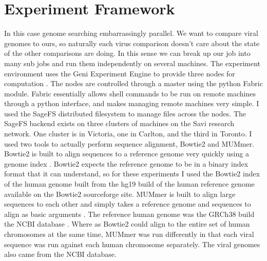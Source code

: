 
\section{Experiment Framework}

In this case genome searching embarrassingly parallel. We want to compare viral genomes to ours, so naturally each virus comparison doesn’t care about the state of the other comparisons are doing. In this sense we can break up our job into many sub jobs and run them independently on several machines. The experiment environment uses the Geni Experiment Engine to provide three nodes for computation \cite{Berman20145}. The nodes are controlled through a master using the python Fabric module. Fabric essentially allows shell commands to be run on remote machines through a python interface, and makes managing remote machines very simple. I used the SageFS distributed filesystem to manage files across the nodes. The SageFS backend exists on three clusters of machines on the Savi research network. One cluster is in Victoria, one in Carlton, and the third in Toronto.  I used two tools to actually perform sequence alignment, Bowtie2 and MUMmer. Bowtie2 is built to align sequences to a reference genome very quickly using a genome index \cite{langmead2012fast}. Bowtie2 expects the reference genome to be in a binary index format that it can understand, so for these experiments I used the Bowtie2 index of the human genome built from the hg19 build of the human reference genome available on the Bowtie2 sourceforge site. MUMmer is built to align large sequences to each other and simply takes a reference genome and sequences to align as basic arguments \cite{delcher1999alignment}. The reference human genome was the GRCh38 build the NCBI database \cite{geer2009ncbi}. Where as Bowtie2 could align to the entire set of human chromosomes at the same time, MUMmer was run differently in that each viral sequence was run against each human chromosome separately. The viral genomes also came from the NCBI database.